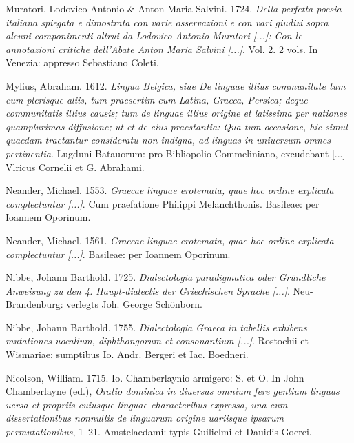 \begin{styleStandard}
Muratori, Lodovico Antonio \& Anton Maria Salvini. 1724. \textit{Della perfetta poesia italiana spiegata e dimostrata con varie osservazioni e con vari giudizi sopra alcuni componimenti altrui da Lodovico Antonio Muratori [...]: Con le annotazioni critiche dell’Abate Anton Maria Salvini [...]}. Vol. 2. 2 vols. In Venezia: appresso Sebastiano Coleti.
\end{styleStandard}

\begin{styleStandard}
Mylius, Abraham. 1612. \textit{Lingua Belgica, siue De linguae illius communitate tum cum plerisque aliis, tum praesertim cum Latina, Graeca, Persica; deque communitatis illius causis; tum de linguae illius origine et latissima per nationes quamplurimas diffusione; ut et de eius praestantia: Qua tum occasione, hic simul quaedam tractantur consideratu non indigna, ad linguas in uniuersum omnes pertinentia}. Lugduni Batauorum: pro Bibliopolio Commeliniano, excudebant [...] Vlricus Cornelii et G. Abrahami.
\end{styleStandard}

\begin{styleStandard}
Neander, Michael. 1553. \textit{Graecae linguae erotemata, quae hoc ordine explicata complectuntur [...]}. Cum praefatione Philippi Melanchthonis. Basileae: per Ioannem Oporinum.
\end{styleStandard}

\begin{styleStandard}
Neander, Michael. 1561. \textit{Graecae linguae erotemata, quae hoc ordine explicata complectuntur [...]}. Basileae: per Ioannem Oporinum.
\end{styleStandard}

\begin{styleStandard}
Nibbe, Johann Barthold. 1725. \textit{Dialectologia paradigmatica oder Gründliche Anweisung zu den 4. Haupt-dialectis der Griechischen Sprache [...]}. Neu-Brandenburg: verlegts Joh. George Schönborn.
\end{styleStandard}

\begin{styleStandard}
Nibbe, Johann Barthold. 1755. \textit{Dialectologia Graeca in tabellis exhibens mutationes uocalium, diphthongorum et consonantium [...]}. Rostochii et Wismariae: sumptibus Io. Andr. Bergeri et Iac. Boedneri.
\end{styleStandard}

\begin{styleStandard}
Nicolson, William. 1715. Io. Chamberlaynio armigero: S. et O. In John Chamberlayne (ed.), \textit{Oratio dominica in diuersas omnium fere gentium linguas uersa et propriis cuiusque linguae characteribus expressa, una cum dissertationibus nonnullis de linguarum origine uariisque ipsarum permutationibus}, 1–21. Amstelaedami: typis Guilielmi et Dauidis Goerei.
\end{styleStandard}

